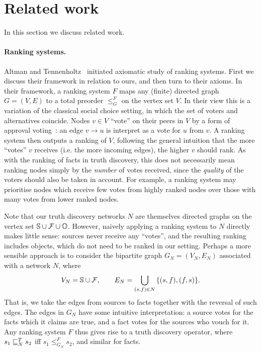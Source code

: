 \section{Related work}
\label{td_sec_relatedwork}

In this section we discuss related work.

\paragraph{Ranking systems.} Altman and Tennenholtz~\cite{altman2008} initiated
axiomatic study of ranking systems. First we discuss their framework in
relation to ours, and then turn to their axioms. In their framework, a ranking
system $F$ maps any (finite) directed graph $G = (V, E)$ to a total preorder
$\le_G^F$ on the vertex set $V$. In their view this is a variation of the
classical social choice setting, in which the set of voters and alternatives
coincide. Nodes $v \in V$ ``vote'' on their peers in $V$ by a form of
approval voting~\cite{laslier2010handbook}: an edge $v \to u$ is interpret as a
vote for $u$ from $v$. A ranking system then outputs a ranking of $V$,
following the general intuition that the more ``votes'' $v$ receives (i.e. the
more incoming edges), the higher $v$ should rank. As with the ranking of facts
in truth discovery, this does not necessarily mean ranking nodes simply by
the \emph{number} of votes received, since the \emph{quality} of the voters
should also be taken in account. For example, a ranking system may prioritise
nodes which receive few votes from highly ranked nodes over those with many
votes from lower ranked nodes.

Note that our truth discovery networks $N$ are themselves directed graphs on
the vertex set $\mathbb{S} \cup \mathcal{F} \cup \mathbb{O}$. However, naively applying a ranking system
to $N$ directly makes little sense: sources never receive any ``votes'', and the
resulting ranking includes objects, which do not need to be ranked in our
setting. Perhaps a more sensible approach is to consider the bipartite graph
$G_N = (V_N, E_N)$ associated with a network $N$, where
\[
    V_N = \mathbb{S} \cup \mathcal{F},
    \qquad
    E_N =
    \bigcup_{(s, f) \in N}{
        \{(s, f), (f, s)\}
    }.
\]
That is, we take the edges from sources to facts together with the reversal of
such edges. The edges in $G_N$ have some intuitive interpretation: a source
votes for the facts which it claims are true, and a fact votes for the sources
who vouch for it. Any ranking system $F$ thus gives rise to a truth discovery
operator, where $s_1 \sqsubseteq_N^T s_2$ iff $s_1 \le_{G_N}^F s_2$, and similar for
facts.

